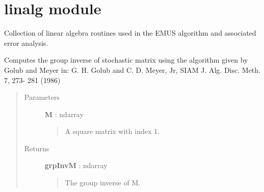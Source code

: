 \documentclass[letterpaper,10pt,english]{sphinxmanual}
\begin{document}
\section{linalg module}
\label{modules/linalg::doc}\label{modules/linalg:module-linalg}\label{modules/linalg:linalg-module}
Collection of linear algebra routines used in the EMUS algorithm and
associated error analysis.

\begin{fulllineitems}
\label{modules/linalg:linalg.groupInverse}
Computes the group inverse of stochastic matrix using the algorithm
given by Golub and Meyer in:
G. H. Golub and C. D. Meyer, Jr, SIAM J. Alg. Disc. Meth. 7, 273-
281 (1986)
\begin{quote}\begin{description}
\item[{Parameters}] \leavevmode
\textbf{M} : ndarray
\begin{quote}

A square matrix with index 1.
\end{quote}

\item[{Returns}] \leavevmode
\textbf{grpInvM} : ndarray
\begin{quote}

The group inverse of M.
\end{quote}

\end{description}\end{quote}

\end{fulllineitems}


\begin{fulllineitems}
\label{modules/linalg:linalg.old_stationary_distrib}
\end{fulllineitems}

\end{document}
